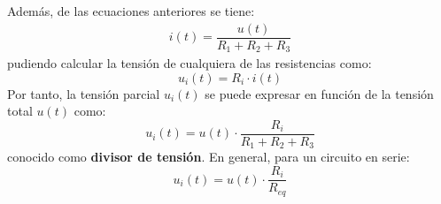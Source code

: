         Además, de las ecuaciones anteriores se tiene:
        \begin{align*}
          i(t) = \dfrac{u(t)}{R_1 + R_2 + R_3}
        \end{align*}
        pudiendo calcular la tensión de cualquiera de las resistencias
        como:
        \begin{equation*}
          u_i(t) = R_i \cdot i(t)
        \end{equation*}
        Por tanto, la tensión parcial $u_i(t)$ se puede expresar en
        función de la tensión total $u(t)$ como:
        \begin{equation*}
          u_i(t) = u(t) \cdot \frac{R_i}{R_1 + R_2 + R_3}
        \end{equation*}
        conocido como \textbf{divisor de tensión}. En general, para un
        circuito en serie:
        \begin{equation}
          \boxed{u_i(t) = u(t) \cdot \frac{R_i}{R_{eq}}}
        \end{equation}
